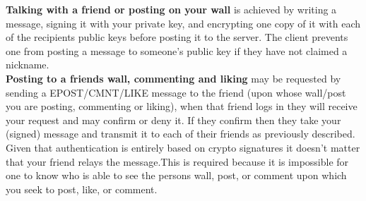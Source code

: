 \textbf{Talking with a friend or posting on your wall} is achieved by writing
a message, signing it with your private key, and encrypting one copy of it with
each of the recipients public keys before posting it to the server. The client
prevents one from posting a message to someone's public key if they have not
claimed a nickname.\\

\textbf{Posting to a friends wall, commenting and liking} may be requested by
sending a EPOST/CMNT/LIKE message to the friend (upon whose wall/post you are
posting, commenting or liking), when that friend logs in they will receive your
request and may confirm or deny it. If they confirm then they take your (signed)
message and transmit it to each of their friends as previously described. Given
that authentication is entirely based on crypto signatures it doesn't matter
that your friend relays the message.This is required because it is impossible
for one to know who is able to see the persons wall, post, or comment upon which
you seek to post, like, or comment.
